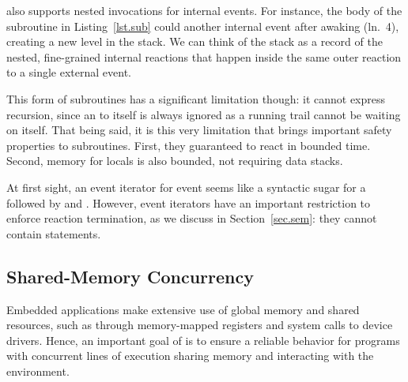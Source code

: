 
\CEU also supports nested  invocations for internal events.
%
For instance, the body of the subroutine  in Listing~\ref{lst.sub}
could  another internal event after awaking (ln.~4), creating a
new level in the stack.
%
We can think of the stack as a record of the nested, fine-grained internal
reactions that happen inside the same outer reaction to a single external
event.

This form of subroutines has a significant limitation though: it cannot
express recursion, since an  to itself is always ignored as a
running trail cannot be waiting on itself.
%
That being said, it is this very limitation that brings important safety
properties to subroutines.
%
First, they guaranteed to react in bounded time.
%
Second, memory for locals is also bounded, not requiring data stacks.

At first sight, an event iterator for event  seems like a syntactic
sugar for a  followed by and .
However, event iterators have an important restriction to enforce reaction
termination, as we discuss in Section~\ref{sec.sem}:
    they cannot contain  statements.

\subsection{Shared-Memory Concurrency}

Embedded applications make extensive use of global memory and shared resources,
such as through memory-mapped registers and system calls to device drivers.
Hence, an important goal of \CEU is to ensure a reliable behavior for programs
with concurrent lines of execution sharing memory and interacting with the
environment.

